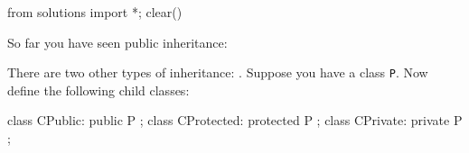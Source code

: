 \begin{python0}
from solutions import *; clear()
\end{python0}

So far you have seen public inheritance:

There are two other types of inheritance: . Suppose you have a class \verb!P!. Now define the following child classes:
\begin{console}
class CPublic: public P {};
class CProtected: protected P {};
class CPrivate: private P {}; 
\end{console}

